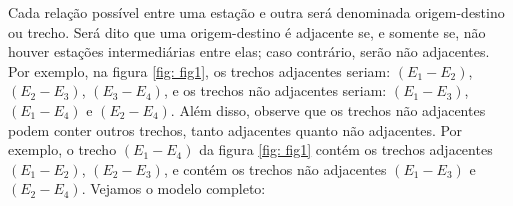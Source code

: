 Cada relação possível entre uma estação e outra será denominada origem-destino ou trecho. Será dito que uma origem-destino é adjacente se, e somente se, não houver estações intermediárias entre elas; caso contrário, serão não adjacentes. Por exemplo, na figura \ref{fig: fig1}, os trechos adjacentes seriam: $(E_1-E_2)$, $(E_2-E_3)$, $(E_3-E_4)$, e os trechos não adjacentes seriam: $(E_1-E_3)$, $(E_1-E_4)$ e $(E_2-E_4)$. Além disso, observe que os trechos não adjacentes podem conter outros trechos, tanto adjacentes quanto não adjacentes. Por exemplo, o trecho $(E_1-E_4)$ da figura \ref{fig: fig1} contém os trechos adjacentes $(E_1-E_2)$, $(E_2-E_3)$, e contém os trechos não adjacentes $(E_1-E_3)$ e $(E_2-E_4)$. Vejamos o modelo completo:


